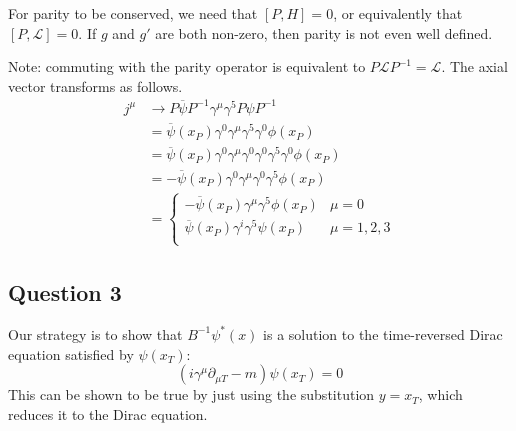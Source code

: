 \documentclass[11pt, oneside]{article}   	%
\theoremstyle{slanted}
\begin{document}
For parity to be conserved, 
we need that $ \left[  P , H  \right]   = 0 $, 
or equivalently that $ \left[  P , \mathcal{ L }  \right]  =0  $. 
If $ g $ and $ g ' $ are both non-zero, 
then parity is not even well defined. 

Note: commuting with the parity operator is equivalent to $ P \mathcal{ L } P ^{ - 1}  = 
\mathcal{ L } $. 
The axial vector transforms as follows. 
\begin{align*}
	j ^ \mu & \to P \overline{\psi  } P^{ - 1 } \gamma ^ \mu \gamma ^ 5 P \psi P ^{ -  1} \\
		&=  \overline{ \psi } \left( x _ P  \right)  \gamma ^ 0 
		\gamma ^ \mu \gamma ^ 5 \gamma ^  0 \phi \left( x _ P  \right)  \\
		&=  \overline{ \psi } \left( x _ P  \right)  \gamma ^  0 
		\gamma ^ \mu \gamma ^  0 \gamma ^ 0 \gamma ^ 5 \gamma ^   0 \phi 
		\left(  x _ P  \right)  \\ 
		&=   - \overline{ \psi } \left( x _ P  \right)  
		\gamma ^  0 \gamma ^ \mu \gamma ^  0 \gamma ^ 5 \phi \left( x_ P  \right) \\ 
		&=  \begin{cases}
			- \overline{ \psi } \left( x _ P  \right)  \gamma ^ \mu \gamma ^ 5 
			\phi \left( x _ P  \right)  &  \mu  = 0 \\
			\overline{ \psi } \left( x _ P  \right)  
			\gamma ^ i \gamma ^ 5 \psi \left( x _ P  \right) 
						    & \mu  = 1 ,2 , 3\\
		\end{cases} 
\end{align*}

\subsection*{Question 3}
Our strategy is to show that $ B ^{  -1 } \psi ^ * \left(  x  \right)  $ 
is a solution to the time-reversed Dirac equation 
satisfied by $ \psi \left(  x _ T  \right)  $: 
\[
	\left( i \gamma ^ \mu \partial  _{ \mu T }  - m  \right)  \psi \left( x _T  \right)  =
	 0 
\] This can be shown to 
be true by just using the substitution $ y  = x _ T $, 
which reduces it to the Dirac equation. 
\end{document}

